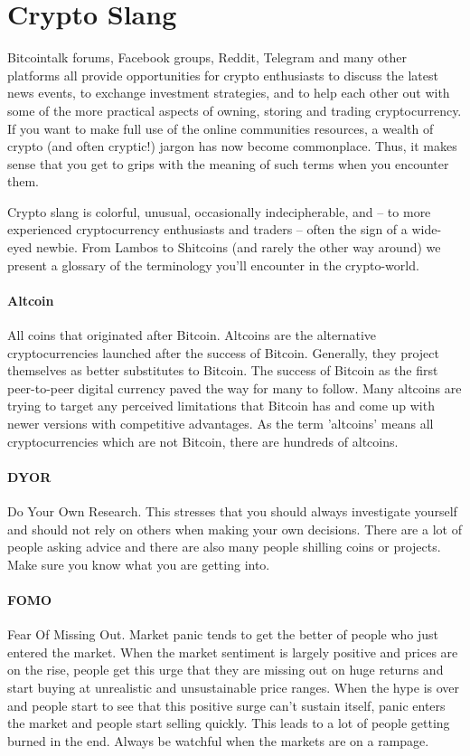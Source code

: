 \section{Crypto Slang}

Bitcointalk forums, Facebook groups, Reddit, Telegram and many other platforms all provide opportunities for crypto enthusiasts to discuss the latest news events, to exchange investment strategies, and to help each other out with some of the more practical aspects of owning, storing and trading cryptocurrency. If you want to make full use of the online communities resources, a wealth of crypto (and often cryptic!) jargon has now become commonplace. Thus, it makes sense that you get to grips with the meaning of such terms when you encounter them.

Crypto slang is colorful, unusual, occasionally indecipherable, and – to more experienced cryptocurrency enthusiasts and traders – often the sign of a wide-eyed newbie. From Lambos to Shitcoins (and rarely the other way around) we present a glossary of the terminology you’ll encounter in the crypto-world.

\paragraph{Altcoin}
All coins that originated after Bitcoin. Altcoins are the alternative cryptocurrencies launched after the success of Bitcoin. Generally, they project themselves as better substitutes to Bitcoin. The success of Bitcoin as the first peer-to-peer digital currency paved the way for many to follow. Many altcoins are trying to target any perceived limitations that Bitcoin has and come up with newer versions with competitive advantages. As the term 'altcoins' means all cryptocurrencies which are not Bitcoin, there are hundreds of altcoins. 

\paragraph{DYOR}
Do Your Own Research. This stresses that you should always investigate yourself and should not rely on others when making your own decisions. There are a lot of people asking advice and there are also many people shilling coins or projects. Make sure you know what you are getting into.

\paragraph{FOMO}
Fear Of Missing Out. Market panic tends to get the better of people who just entered the market. When the market sentiment is largely positive and prices are on the rise, people get this urge that they are missing out on huge returns and start buying at unrealistic and unsustainable price ranges. When the hype is over and people start to see that this positive surge can't sustain itself, panic enters the market and people start selling quickly. This leads to a lot of people getting burned in the end. Always be watchful when the markets are on a rampage.

